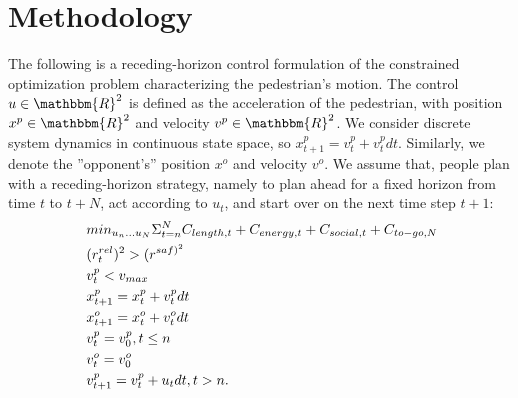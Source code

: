 \documentclass[conference]{IEEEtran}
\begin{document}
\section{Methodology}
\vspace{-0.3em}
The following is a receding-horizon control formulation of the constrained 
optimization problem characterizing the pedestrian's motion. The control 
$u \in \mathbbm{R}^2$ 
is defined as the acceleration of the pedestrian, with 
position $x^p \in \mathbbm{R}^2$ and velocity $v^p \in \mathbbm{R}^2$. We  
consider
discrete system dynamics in continuous state space, so $x_{t+1}^p = v_t^p + v_t^p dt$.
Similarly, we denote the ''opponent's'' position $x^o$ and velocity $v^o$. We assume that, 
people plan with a receding-horizon strategy, namely to plan ahead for a fixed 
horizon from time $t$ to $t+N$, act according to $u_t$, and start over on the 
next time step $t+1$:
\begin{equation}~\label{eq:receding_control}
  \begin{aligned}
    &min_{u_n \dots u_N} \Sigma^N_{t=n} \small{C_{length,t} + C_{energy,t} + C_{social,t}} + C_{to-go,N}\\
    & (r^{rel}_t)^2 > (r^{{saf})^2}\\
    & v^p_t < v_{max}\\
    & x^p_{t+1} = x^p_t + v^p_t \scriptsize{d}t\\
    & x^o_{t+1} = x^o_t + v^o_t \scriptsize{d}t\\
    & v^p_t = v^p_0, t \leq n\\
    & v^o_t = v^o_0\\
    & v^p_{t+1} = v^p_t + u_t \scriptsize{d}t, t>n.
 \end{aligned}
\end{equation}
\end{document}
